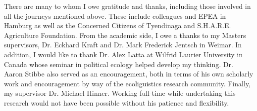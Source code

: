 \documentclass[a4paper, 11pt, twoside]{Thesis}  %
\begin{document}
{There are many to whom I owe gratitude and thanks, including those involved in all the journeys mentioned above. These include colleagues and EPEA in Hamburg as well as the Concerned Citizens of Tyendinaga and S.H.A.R.E. Agriculture Foundation. From the academic side, I owe a thanks to my Masters supervisors, Dr. Eckhard Kraft and Dr. Mark Frederick Jentsch in Weimar. In addition, I would like to thank Dr. Alex Latta at Wilfrid Laurier University in Canada whose seminar in political ecology helped develop my thinking. Dr. Aaron Stibbe also served as an encouragement, both in terms of his own scholarly work and encouragement by way of the ecoliguistics research community. Finally, my supervisor Dr. Michael Hinner. Working full-time while undertaking this research would not have been possible without his patience and flexibility. 

}
\clearpage  %

\pagestyle{fancy}  %


\tableofcontents  %

\listoffigures  %

\listoftables  %
\end{document}
